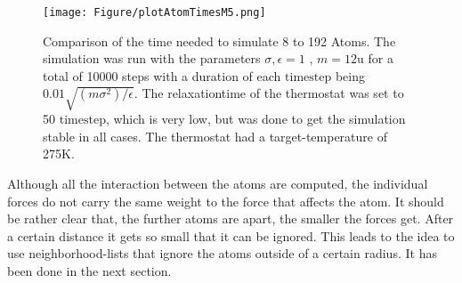 \begin{figure}
	\begin{center}
		\texttt{[image: Figure/plotAtomTimesM5.png]}
	\end{center}
	\caption[Comparison of the time needed to simulate 8 to 192 Atoms]{Comparison of the time needed to simulate 8 to 192 Atoms. The simulation was run with the parameters $\sigma, \epsilon = 1$ , $m = 12\mathrm{u}$ for a total of 10000 steps with a duration of each $\mathrm{timestep}$ being $0.01\sqrt{(m\sigma^2)/\epsilon} $. The relaxationtime of the thermostat was set to 50 $\mathrm{timestep} $, which is very low, but was done to get the simulation stable in all cases. The thermostat had a target-temperature of 275K.} 
	\label{PlotSimulationTimeBerendsenThermostat}
\end{figure}

Although all the interaction between the atoms are computed, the individual forces do not carry the same weight to the force that affects the atom. It should be rather clear that, the further atoms are apart, the smaller the forces get. After a certain distance it gets so small that it can be ignored. This leads to the idea to use neighborhood-lists that ignore the atoms outside of a certain radius. It has been done in the next section.

